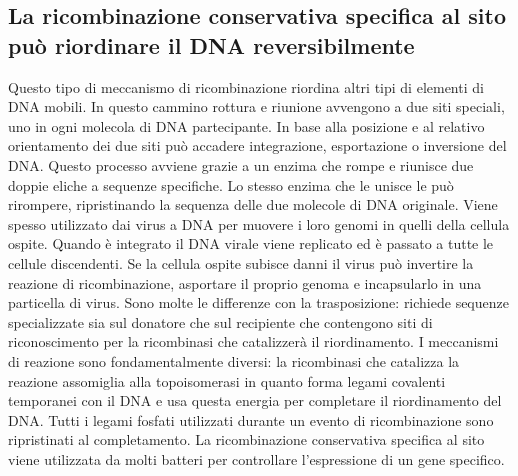 \subsection{La ricombinazione conservativa specifica al sito pu\`o riordinare il DNA reversibilmente}
Questo tipo di meccanismo di ricombinazione riordina altri tipi di elementi di DNA mobili. In questo cammino rottura e riunione avvengono a due siti speciali, uno in ogni molecola di DNA
partecipante. In base alla posizione e al relativo orientamento dei due siti pu\`o accadere integrazione, esportazione o inversione del DNA. Questo processo avviene grazie a un enzima 
che rompe e riunisce due doppie eliche a sequenze specifiche. Lo stesso enzima che le unisce le pu\`o rirompere, ripristinando la sequenza delle due molecole di DNA originale. Viene
spesso utilizzato dai virus a DNA per muovere i loro genomi in quelli della cellula ospite. Quando \`e integrato il DNA virale viene replicato ed \`e passato a tutte le cellule 
discendenti. Se la cellula ospite subisce danni il virus pu\`o invertire la reazione di ricombinazione, asportare il proprio genoma e incapsularlo in una particella di virus. Sono
molte le differenze con la trasposizione: richiede sequenze specializzate sia sul donatore che sul recipiente che contengono siti di riconoscimento per la ricombinasi che catalizzer\`a
il riordinamento. I meccanismi di reazione sono fondamentalmente diversi: la ricombinasi che catalizza la reazione assomiglia alla topoisomerasi in quanto forma legami covalenti 
temporanei con il DNA e usa questa energia per completare il riordinamento del DNA. Tutti i legami fosfati utilizzati durante un evento di ricombinazione sono ripristinati al 
completamento. La ricombinazione conservativa specifica al sito viene utilizzata da molti batteri per controllare l'espressione di un gene specifico.
